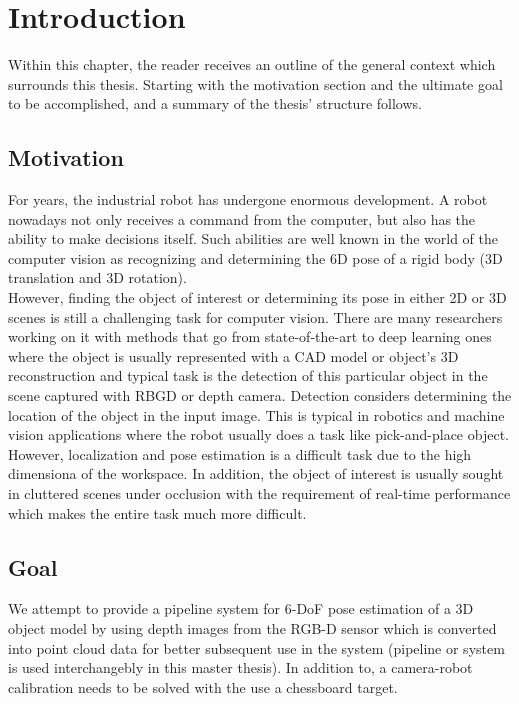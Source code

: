 \chapter{Introduction}
\label{chap:intro}

Within this chapter, the reader receives an outline of the general context which surrounds this thesis. Starting with the motivation section and the ultimate goal to be accomplished, and a summary of the thesis' structure follows. 

\section{Motivation}

For years, the industrial robot has undergone enormous development. A robot nowadays not only receives a command from the computer, but also has the ability to make decisions itself. Such abilities are well known in the world of the computer vision as recognizing and determining the 6D pose of a rigid body (3D translation and 3D rotation). \\
However, finding the object of interest or determining its pose in either 2D or 3D scenes is still a challenging task for computer vision. There are many researchers working on it with methods that go from state-of-the-art to deep learning ones where the object is usually represented with a CAD model or object's 3D reconstruction and typical task is the detection of this particular object in the scene captured with RBGD or depth camera. Detection considers determining the location of the object in the input image. This is typical in robotics and machine vision applications where the robot usually does a task like pick-and-place object. However, localization and pose estimation is a difficult task due to the high dimensiona of the workspace. In addition, the object of interest is usually sought in cluttered scenes under occlusion with the requirement of real-time performance which makes the entire task much more difficult.

\section{Goal}
\iffalse
We attempt to provide a pipeline system for 6-DoF pose estimation of a 3D object model by using depth images from the RGB-D sensor which is converted into point cloud data for better subsequent use in the system (pipeline or system is used interchangebly in this master thesis). In addition to, a camera-robot calibration needs to be solved with the use a chessboard target.

